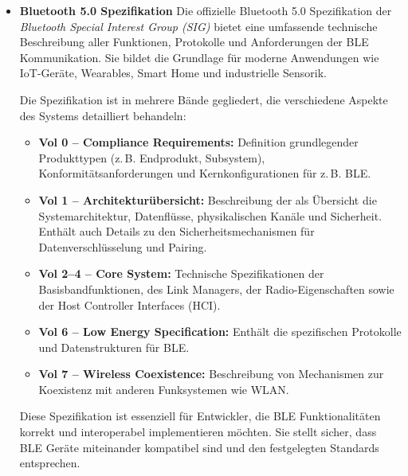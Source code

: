 \begin{itemize}
		Die Dokumentation ermöglicht ein tiefgehendes Verständnis der Hardware, insbesondere wenn man den BLE Stack direkt nutzen möchte. Sie ist insbesondere für fortgeschrittene Projekte mit hoher Performance oder eigenem Protokolldesign relevant. \cite{NordicSemiconductor.2024}
		
		
		
		\item \textbf{Bluetooth 5.0 Spezifikation}  
		Die offizielle Bluetooth 5.0 Spezifikation der \textit{Bluetooth Special Interest Group (SIG)} bietet eine umfassende technische Beschreibung aller Funktionen, Protokolle und Anforderungen der BLE  Kommunikation. Sie bildet die Grundlage für moderne Anwendungen wie IoT-Geräte, Wearables, Smart Home und industrielle Sensorik.
		
		Die Spezifikation ist in mehrere Bände gegliedert, die verschiedene Aspekte des Systems detailliert behandeln:
		
		\begin{itemize}
			\item \textbf{Vol 0 – Compliance Requirements:} Definition grundlegender Produkttypen (z.\,B. Endprodukt, Subsystem), Konformitätsanforderungen und Kernkonfigurationen für z.\,B. BLE.
			\item \textbf{Vol 1 – Architekturübersicht:} Beschreibung der als Übersicht die Systemarchitektur, Datenflüsse, physikalischen Kanäle und Sicherheit. Enthält auch Details zu den Sicherheitsmechanismen für Datenverschlüsselung und Pairing.
			\item \textbf{Vol 2–4 – Core System:} Technische Spezifikationen der Basisbandfunktionen, des Link Managers, der Radio-Eigenschaften sowie der Host Controller Interfaces (HCI).
			\item \textbf{Vol 6 – Low Energy Specification:} Enthält die spezifischen Protokolle und Datenstrukturen für BLE.
			\item \textbf{Vol 7 – Wireless Coexistence:} Beschreibung von Mechanismen zur Koexistenz mit anderen Funksystemen wie WLAN.
		\end{itemize}
		
		Diese Spezifikation ist essenziell für Entwickler, die BLE Funktionalitäten korrekt und interoperabel implementieren möchten. Sie stellt sicher, dass BLE Geräte miteinander kompatibel sind und den festgelegten Standards entsprechen. \cite{BluetoothSpecialInterestGroup.2024}

		
	\end{itemize}



